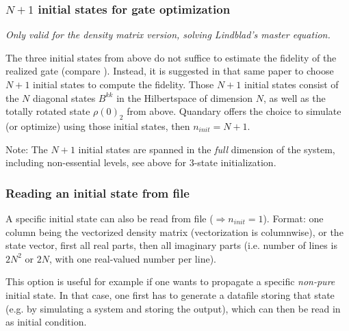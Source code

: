 \documentclass[11pt]{article}
\begin{document}
\subsubsection{$N+1$ initial states for gate optimization}
\textit{Only valid for the density matrix version, solving Lindblad's master equation.}


The three initial states from above do not suffice to estimate the fidelity of the realized gate (compare \cite{goerz2014optimal}). Instead, it is suggested in that same paper to choose $N+1$ initial states to compute the fidelity. Those $N+1$ initial states consist of the $N$ diagonal states $B^{kk}$ in the Hilbertspace of dimension $N$, as well as the totally rotated state $\rho(0)_2$ from above. Quandary offers the choice to simulate (or optimize) using those initial states, then $n_{init} = N+1$.

Note: The $N+1$ initial states are spanned in the \textit{full} dimension of the system, including non-essential levels, see above for 3-state initialization. 

\subsubsection{Reading an initial state from file}
A specific initial state can also be read from file ($\Rightarrow n_{init}=1$). Format: one column being the vectorized density matrix (vectorization is columnwise), or the state vector, first all real parts, then all imaginary parts (i.e. number of lines is $2N^2$ or $2N$, with one real-valued number per line). 

This option is useful for example if one wants to propagate a specific \textit{non-pure} initial state. In that case, one first has to generate a datafile storing that state (e.g. by simulating a system and storing the output), which can then be read in as initial condition. 
\end{document}
